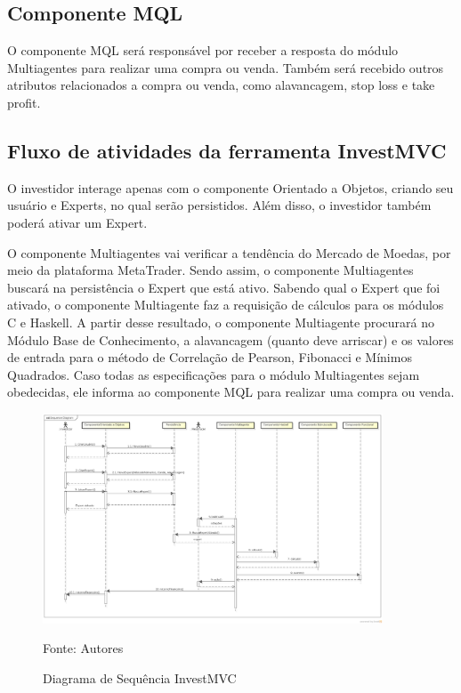 \subsection{Componente MQL}

O componente MQL será responsável por receber a resposta do módulo Multiagentes para realizar uma compra ou venda. Também será recebido outros atributos relacionados a compra ou venda, como alavancagem, stop loss e take profit.

\subsection{Fluxo de atividades  da ferramenta InvestMVC}

O investidor interage apenas com o componente Orientado a Objetos, criando seu usuário e Experts, no qual serão persistidos. Além disso, o investidor também poderá ativar um Expert.

O componente Multiagentes vai verificar a tendência do Mercado de Moedas, por meio da plataforma MetaTrader. Sendo assim, o componente Multiagentes buscará na persistência o Expert que está ativo. Sabendo qual o Expert que foi ativado, o componente Multiagente faz a requisição de cálculos para os módulos C e Haskell. A partir desse resultado, o componente Multiagente procurará no Módulo Base de Conhecimento, a alavancagem (quanto deve arriscar) e os valores de entrada para o método de Correlação de Pearson, Fibonacci e Mínimos Quadrados. Caso todas as especificações para o módulo Multiagentes sejam obedecidas, ele informa ao componente MQL para realizar uma compra ou venda.

\begin{figure}[htp]
\centering
\includegraphics[width=0.9\textwidth]{figuras/sequencia}
\caption{Diagrama de Sequência InvestMVC}{Fonte: Autores} 
\label{sequencia}
\end{figure}
